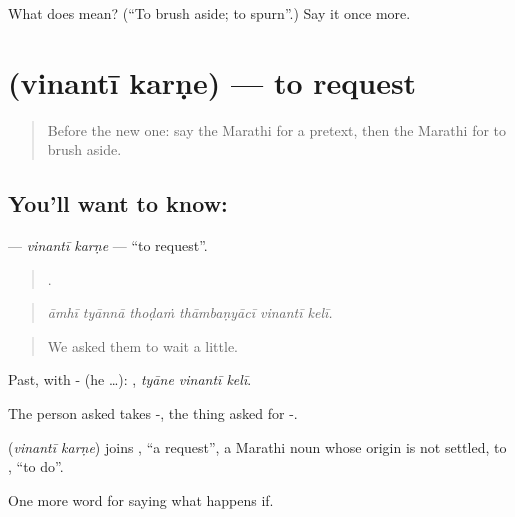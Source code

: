 \begin{tcolorbox}[breakable,colback=teal!4,colframe=teal!35!black,title={Before you move on}]
What does  mean? (\textquotedblleft{}To brush aside; to spurn\textquotedblright{}.) Say it once more.
\end{tcolorbox}
\section[\texorpdfstring{\mr{विनंती} \mr{करणे} (vinantī karṇe)}{विनंती करणे (vinantī karṇe)}]{  (vinantī karṇe) — to request}

\label{lesson:MR-C393-vinanti-karne}



\begin{quote}
Before the new one: say the Marathi for a pretext, then the Marathi for to brush aside.
\end{quote}

\subsection*{You'll want to know:  }
\textbf{ } — \emph{vinantī karṇe} — \textquotedblleft{}to request\textquotedblright{}.

\begin{quote}
     .
\end{quote}

\begin{quote}
\emph{āmhī tyānnā thoḍaṁ thāmbaṇyācī vinantī kelī.}
\end{quote}

\begin{quote}
We asked them to wait a little.
\end{quote}

Past, with - (he …):   , \emph{tyāne vinantī kelī}.

The person asked takes -, the thing asked for -.

\begin{cousinweb}
\textbf{ } (\emph{vinantī karṇe}) joins , \textquotedblleft{}a request\textquotedblright{}, a Marathi noun whose origin is not settled, to , \textquotedblleft{}to do\textquotedblright{}.
\end{cousinweb}

\begin{grammarlens}[title={What you've built}]
One more word for saying what happens if.
\end{grammarlens}

